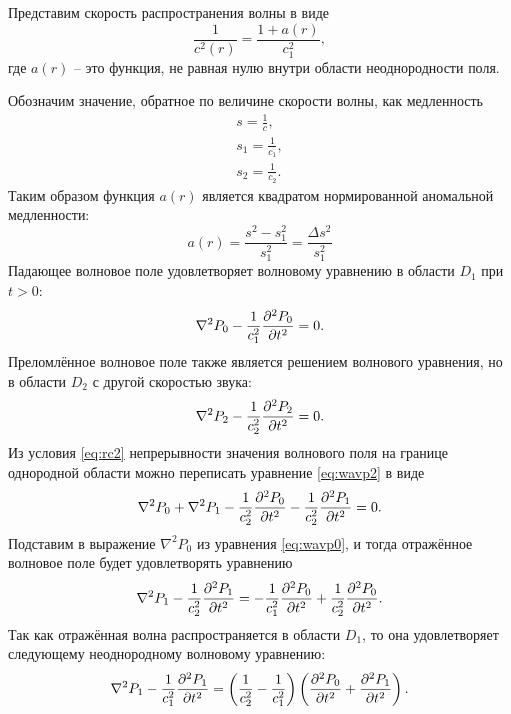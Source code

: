 \documentclass[a4paper, fontsize=14pt]{article}
\begin{document}
	
	Представим скорость распространения волны в виде
	\begin{equation}
		\frac{1}{c^2(r)} = \frac{1+a(r)}{c_1^2},
	\end{equation}
	где $a(r)$ -- это функция, не равная нулю внутри области неоднородности поля.
	  
	Обозначим значение, обратное по величине скорости волны, как медленность 
	\begin{gather*}
		s = \frac{1}{c}, \\
		s_1 = \frac{1}{c_1}, \\
		s_2 = \frac{1}{c_2}.
	\end{gather*}
	Таким образом функция $a(r)$ является квадратом нормированной аномальной медленности:
	$$
	a(r) = \frac{s^2 - s_1^2}{s_1^2} = \frac{\Delta s^2}{s_1^2}
	$$
	Падающее волновое поле удовлетворяет волновому уравнению в области $D_1$ при $t>0$:
	\begin{equation}
		\nabla^2 P_0 - \frac{1}{c_1^2}\diff[2]{P_0}{t} = 0.
		\label{eq:wavp0}
	\end{equation}
	Преломлённое волновое поле также является решением волнового уравнения, но в области $D_2$ с другой скоростью звука:
	\begin{equation}
		\nabla^2 P_2 - \frac{1}{c_2^2}\diff[2]{P_2}{t} = 0.
		\label{eq:wavp2}
	\end{equation}
	Из условия \eqref{eq:rc2} непрерывности значения  волнового поля на границе однородной области можно переписать уравнение \eqref{eq:wavp2} в виде
	\begin{equation}
		\nabla^2 P_0 + \nabla^2 P_1 - \frac{1}{c_2^2}\diff[2]{P_0}{t} - \frac{1}{c_2^2}\diff[2]{P_1}{t}  = 0.
		\label{eq:wavp01sum}
	\end{equation}
	Подставим в выражение $\nabla^2 P_0$ из уравнения \eqref{eq:wavp0}, и
	тогда отражённое волновое поле будет удовлетворять уравнению \cite{bleistein2012mathematical}
	\begin{equation}
		\nabla^2 P_1 - \frac{1}{c_2^2}\diff[2]{P_1}{t}  = - \frac{1}{c_1^2}\diff[2]{P_0}{t} + \frac{1}{c_2^2}\diff[2]{P_0}{t}.
	\end{equation}
	Так как отражённая волна распространяется в области $D_1$, то она удовлетворяет следующему неоднородному волновому уравнению:
	\begin{equation}
		\nabla^2 P_1 - \frac{1}{c_1^2}\diff[2]{P_1}{t}  = \left(\frac{1}{c_2^2} - \frac{1}{c_1^2}\right)\left(\diff[2]{P_0}{t} + \diff[2]{P_1}{t}\right).
		\label{eq:wavp1inh}
	\end{equation}
\end{document}
